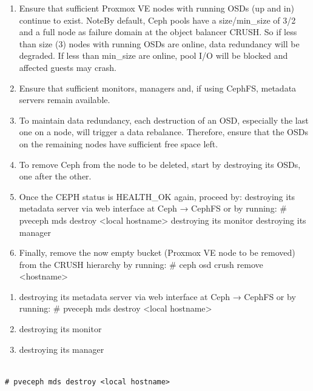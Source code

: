 \begin{enumerate}[leftmargin=2cm]

	\item Ensure that sufficient Proxmox VE nodes with running OSDs (up and in) continue to exist. NoteBy default, Ceph pools have a size/min_size of 3/2 and a full node as failure domain at the object balancer CRUSH. So if less than size (3) nodes with running OSDs are online, data redundancy will be degraded. If less than min_size are online, pool I/O will be blocked and affected guests may crash.

	\item Ensure that sufficient monitors, managers and, if using CephFS, metadata servers remain available.

	\item To maintain data redundancy, each destruction of an OSD, especially the last one on a node, will trigger a data rebalance. Therefore, ensure that the OSDs on the remaining nodes have sufficient free space left.

	\item To remove Ceph from the node to be deleted, start by destroying its OSDs, one after the other.

	\item Once the CEPH status is HEALTH_OK again, proceed by: destroying its metadata server via web interface at Ceph → CephFS or by running: # pveceph mds destroy <local hostname> destroying its monitor destroying its manager

	\item Finally, remove the now empty bucket (Proxmox VE node to be removed) from the CRUSH hierarchy by running: # ceph osd crush remove <hostname>

\end{enumerate}

\begin{enumerate}[leftmargin=2cm]

	\item destroying its metadata server via web interface at Ceph → CephFS or by running: # pveceph mds destroy <local hostname>

	\item destroying its monitor

	\item destroying its manager

\end{enumerate}

\begin{lstlisting}

# pveceph mds destroy <local hostname>

\end{lstlisting}

